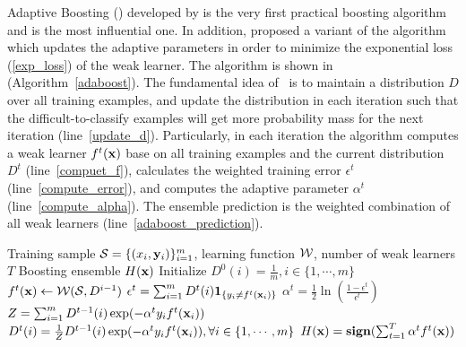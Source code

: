 {Adaptive Boosting (\adaboost) developed by \citet{Freund97a} is the very first practical boosting algorithm and is the most influential one.
In addition, \citet{Schapire99improved} proposed a variant of the algorithm which updates the adaptive parameters in order to minimize the exponential loss (\ref{exp_loss}) of the weak learner.
The algorithm is shown in (Algorithm~\ref{adaboost}).
The fundamental idea of \adaboost\ is to maintain a distribution $D$ over all training examples, and update the distribution in each iteration such that the difficult-to-classify examples will get more probability mass for the next iteration (line~\ref{update_d}).
Particularly, in each iteration the algorithm computes a weak learner $f^t(\mathbf {x})$ base on all training examples and the current distribution $D^{t}$ (line~\ref{compuet_f}), calculates the weighted training error $\epsilon^t$ (line~\ref{compute_error}), and computes the adaptive parameter $\alpha^t$ (line~\ref{compute_alpha}).
The ensemble prediction is the weighted combination of all weak learners (line~\ref{adaboost_prediction}).

\begin{algorithm}
\caption{\adaboost}
\label{adaboost}
\begin{algorithmic}[1]
	\REQUIRE Training sample $\mathcal{S} = \{(x_i,\mathbf {y}_i)\}_{i=1}^m$, learning function $\mathcal{W}$, number of weak learners $T$
	\ENSURE Boosting ensemble $H(\mathbf {x})$
	\STATE Initialize $D^0(i)=\frac{1}{m},i\in\{1,\cdots,m\}$
		\STATE $f^t(\mathbf {x})\leftarrow\mathcal{W}(\mathcal{S},D^{i-1})$ \label{compuet_f}
		\STATE $\epsilon^t = \sum_{i=1}^{m}D^t(i)\mathbf{1}_{\{y_i\neq f^t(\mathbf {x}_i)\}}$ \label{compute_error}
		\STATE $\alpha^{t} = \frac{1}{2}\ln\left(\frac{1-\epsilon^t}{\epsilon^t}\right)$ \label{compute_alpha}
		\STATE $Z=\sum_{i=1}^{m}D^{t-1}(i)\exp(-\alpha^ty_if^t(\mathbf {x}_i))$
		\STATE $D^t(i) = \frac{1}{Z}D^{t-1}(i)\exp(-\alpha^ty_if^t(\mathbf {x}_i)),\forall i\in\{1,\cdots,m\}$ \label{update_d}
	\ENDFOR
	\RETURN $H(\mathbf {x}) = \textbf{sign}(\sum_{t=1}^T\alpha^tf^t(\mathbf {x}))$ \label{adaboost_prediction}
\end{algorithmic}
\end{algorithm}

}
